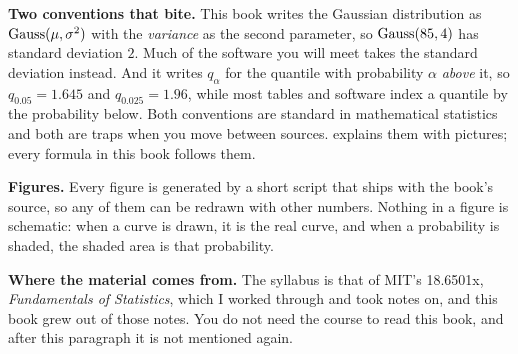 \textbf{Two conventions that bite.}
This book writes the Gaussian distribution as $\text{Gauss}(\mu, \sigma^2)$ with the \textit{variance} as the second parameter, so $\text{Gauss}(85, 4)$ has standard deviation $2$.
Much of the software you will meet takes the standard deviation instead.
And it writes $q_\alpha$ for the quantile with probability $\alpha$ \textit{above} it, so $q_{0.05} = 1.645$ and $q_{0.025} = 1.96$, while most tables and software index a quantile by the probability below.
Both conventions are standard in mathematical statistics and both are traps when you move between sources.
 explains them with pictures; every formula in this book follows them.

\textbf{Figures.}
Every figure is generated by a short script that ships with the book's source, so any of them can be redrawn with other numbers.
Nothing in a figure is schematic: when a curve is drawn, it is the real curve, and when a probability is shaded, the shaded area is that probability.

\textbf{Where the material comes from.}
The syllabus is that of MIT's 18.6501x, \textit{Fundamentals of Statistics}, which I worked through and took notes on, and this book grew out of those notes.
You do not need the course to read this book, and after this paragraph it is not mentioned again.
